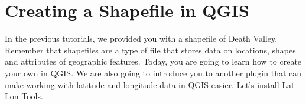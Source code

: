 \documentclass[oneside,a4paper,11pt,explicit]{book}
\begin{document}
	\noindent{}
	
	\vspace{1 em}
	
	\section{Creating a Shapefile in QGIS}
	
	In the previous tutorials, we provided you with a shapefile of Death Valley. Remember that shapefiles are a type of file that stores data on locations, shapes and attributes of geographic features. Today, you are going to learn how to create your own in QGIS. We are also going to introduce you to another plugin that can make working with latitude and longitude data in QGIS easier. Let's install Lat Lon Tools. 
	
\end{document}
